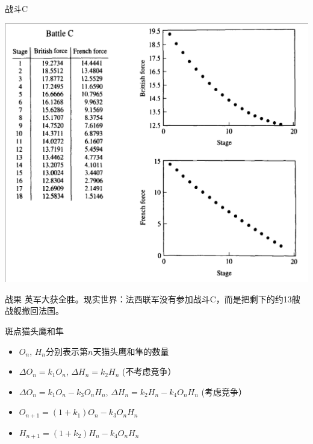 \documentclass{beamer}
\begin{document}
\begin{frame}{战斗C}
  \begin{center}
    \includegraphics[height=.9\textheight{}]{fight-C.png}
  \end{center}  
\end{frame}

\begin{frame}{战果}
  英军大获全胜。现实世界：法西联军没有参加战斗C，而是把剩下的约13艘战舰撤回法国。

\end{frame}

\begin{frame}{斑点猫头鹰和隼}
  \begin{itemize}
  \item<1-> $O_n$, $H_n$分别表示第$n$天猫头鹰和隼的数量
  \item<2-> $\Delta O_n=k_1O_n$, $\Delta H_n=k_2H_n$ (不考虑竞争）
  \item<3-> $\Delta O_n=k_1O_n - k_3O_nH_n$, $\Delta H_n=k_2H_n-k_4O_nH_n$ (考虑竞争）
  \item<4-> $O_{n+1}=(1+k_1)O_n - k_3O_nH_n$
  \item<4-> $H_{n+1}=(1+k_2)H_n-k_4O_nH_n$
  \end{itemize}
  
\end{frame}
\end{document}
